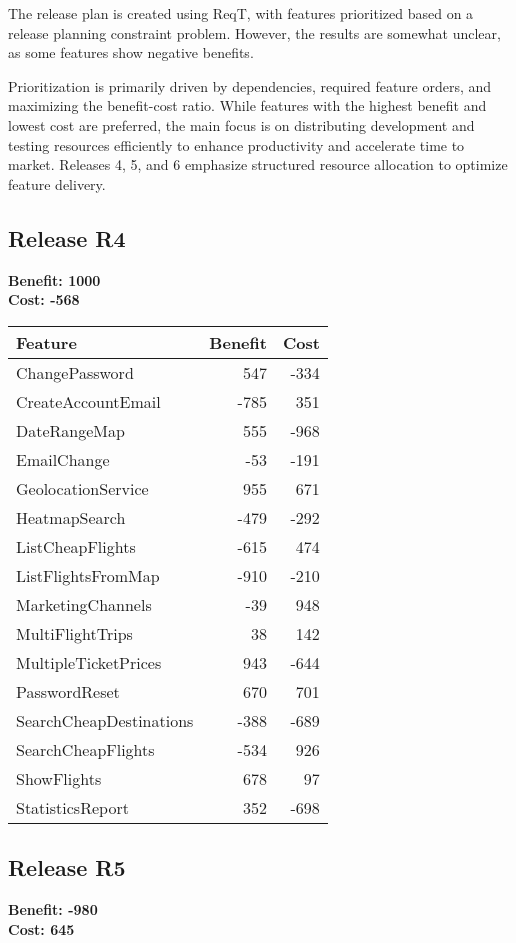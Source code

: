The release plan is created using ReqT, with features prioritized based on a release planning constraint problem. However, the results are somewhat unclear, as some features show negative benefits.

Prioritization is primarily driven by dependencies, required feature orders, and maximizing the benefit-cost ratio. While features with the highest benefit and lowest cost are preferred, the main focus is on distributing development and testing resources efficiently to enhance productivity and accelerate time to market. Releases 4, 5, and 6 emphasize structured resource allocation to optimize feature delivery.

\subsection{Release R4}
\textbf{Benefit: 1000} \\
\textbf{Cost: -568} \\

\begin{tabular}{lrr}
\toprule
\textbf{Feature} & \textbf{Benefit} & \textbf{Cost} \\
\midrule
ChangePassword & 547 & -334 \\
CreateAccountEmail & -785 & 351 \\
DateRangeMap & 555 & -968 \\
EmailChange & -53 & -191 \\
GeolocationService & 955 & 671 \\
HeatmapSearch & -479 & -292 \\
ListCheapFlights & -615 & 474 \\
ListFlightsFromMap & -910 & -210 \\
MarketingChannels & -39 & 948 \\
MultiFlightTrips & 38 & 142 \\
MultipleTicketPrices & 943 & -644 \\
PasswordReset & 670 & 701 \\
SearchCheapDestinations & -388 & -689 \\
SearchCheapFlights & -534 & 926 \\
ShowFlights & 678 & 97 \\
StatisticsReport & 352 & -698 \\
\bottomrule
\end{tabular}

\subsection{Release R5}
\textbf{Benefit: -980} \\
\textbf{Cost: 645} \\

